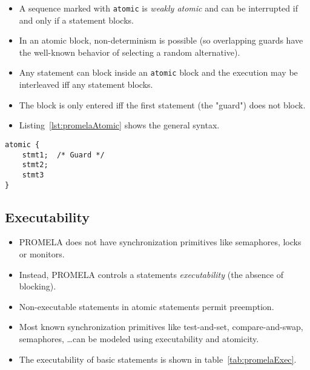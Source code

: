 \documentclass[a4paper, 11pt, accentcolor = tud3b]{tudreport}
\newcommand{\inlinePromela}[1]{\lstinline[language = PROMELA]|#1|}
\begin{document}
					\begin{itemize}
						\item A sequence marked with \inlinePromela{atomic} is \textit{weakly atomic} and can be interrupted if and only if a statement blocks.
						\item In an atomic block, non-determinism is possible (so overlapping guards have the well-known behavior of selecting a random alternative).
						\item Any statement can block inside an \inlinePromela{atomic} block and the execution may be interleaved iff any statement blocks.
						\item The block is only entered iff the first statement (the "guard") does not block.
						\item Listing~\ref{lst:promelaAtomic} shows the general syntax.
					\end{itemize}
				
					\begin{lstlisting}[caption = { Atomic Sequence in PROMELA }, label = lst:promelaAtomic, language = PROMELA]
atomic {
	stmt1;  /* Guard */
	stmt2;
	stmt3
}
					\end{lstlisting}

			\subsection{Executability} %
				\label{sec:promelaExec}
			
				\begin{itemize}
					\item PROMELA does not have synchronization primitives like semaphores, locks or monitors.
					\item Instead, PROMELA controls a statements \textit{executability} (the absence of blocking).
					\item Non-executable statements in atomic statements permit preemption.
					\item Most known synchronization primitives like test-and-set, compare-and-swap, semaphores, \dots can be modeled using executability and atomicity.
					\item The executability of basic statements is shown in table~\ref{tab:promelaExec}.
				\end{itemize}
			
\end{document}
